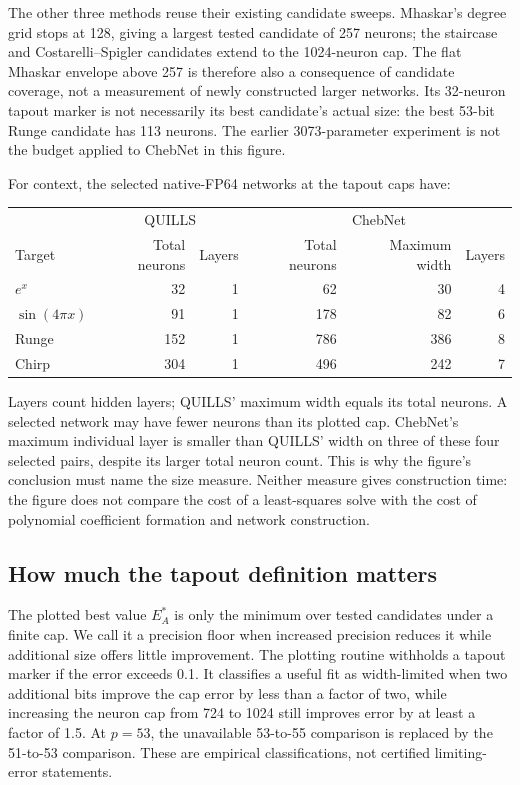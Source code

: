 \documentclass[11pt]{article}
\begin{document}
The other three methods reuse their existing candidate sweeps. Mhaskar's degree grid stops at 128, giving a largest tested candidate of 257 neurons; the staircase and Costarelli--Spigler candidates extend to the 1024-neuron cap. The flat Mhaskar envelope above 257 is therefore also a consequence of candidate coverage, not a measurement of newly constructed larger networks. Its 32-neuron tapout marker is not necessarily its best candidate's actual size: the best 53-bit Runge candidate has 113 neurons. The earlier 3073-parameter experiment is not the budget applied to ChebNet in this figure.

\begin{samepage}
For context, the selected native-FP64 networks at the tapout caps have:
\begin{center}\small
\begin{tabular}{lrrrrr}
\toprule
&\multicolumn{2}{c}{QUILLS}&\multicolumn{3}{c}{ChebNet}\\
Target&Total neurons&Layers&Total neurons&Maximum width&Layers\\
\midrule
\(e^x\)&32&1&62&30&4\\
\(\sin(4\pi x)\)&91&1&178&82&6\\
Runge&152&1&786&386&8\\
Chirp&304&1&496&242&7\\
\bottomrule
\end{tabular}
\end{center}
\end{samepage}
Layers count hidden layers; QUILLS' maximum width equals its total neurons. A selected network may have fewer neurons than its plotted cap. ChebNet's maximum individual layer is smaller than QUILLS' width on three of these four selected pairs, despite its larger total neuron count. This is why the figure's conclusion must name the size measure. Neither measure gives construction time: the figure does not compare the cost of a least-squares solve with the cost of polynomial coefficient formation and network construction.

\subsection{How much the tapout definition matters}
The plotted best value \(E_A^*\) is only the minimum over tested candidates under a finite cap. We call it a precision floor when increased precision reduces it while additional size offers little improvement. The plotting routine withholds a tapout marker if the error exceeds 0.1. It classifies a useful fit as width-limited when two additional bits improve the cap error by less than a factor of two, while increasing the neuron cap from 724 to 1024 still improves error by at least a factor of 1.5. At \(p=53\), the unavailable 53-to-55 comparison is replaced by the 51-to-53 comparison. These are empirical classifications, not certified limiting-error statements.
\end{document}
